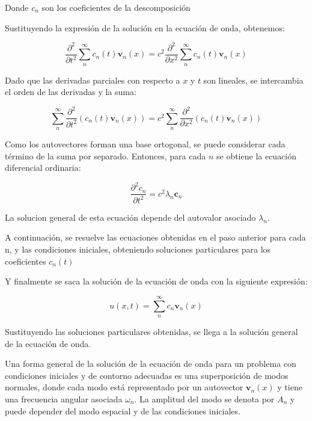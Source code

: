 \documentclass{article}
\begin{document}
    Donde \(c_n\) son los coeficientes de la descomposición
    
    Sustituyendo la expresión de la solución en la ecuación de onda, obtenemos:

    \begin{equation}
        \frac{{\partial^2}}{{\partial t^2}}{\sum_{n}^{\infty} c_n(t) \mathbf{v}_n(x)} = c^2\frac{{\partial^2}}{{\partial x^2}}{\sum_{n}^{\infty} c_n(t) \mathbf{v}_n(x)}
    \end{equation}
    
    Dado que las derivadas parciales con respecto a $x$ y $t$ son lineales, se intercambia el orden de las derivadas y la suma:

    \begin{equation}
        {\sum_{n}^{\infty} \frac{{\partial^2}}{{\partial t^2}}(c_n(t) \mathbf{v}_n(x))} = c^2{\sum_{n}^{\infty}\frac{{\partial^2}}{{\partial x^2}}(c_n(t) \mathbf{v}_n(x))}
    \end{equation}
    
    Como los autovectores forman una base ortogonal, se puede considerar cada término de la suma por separado. Entonces, para cada $n$ se obtiene la ecuación diferencial ordinaria:

    \begin{equation}
        \frac{{\partial^2 c_n}}{{\partial t^2}} = c^2\lambda_n \mathbf c_n
    \end{equation}

    La solucion general de esta ecuación depende del autovalor asociado $\lambda_n$.

    A continuación, se resuelve las ecuaciones obtenidas en el paso anterior para cada n, y las condiciones iniciales, obteniendo soluciones particulares para los coeficientes $c_n(t)$

    Y finalmente se saca la solución de la ecuación de onda con la siguiente expresión:

    \begin{equation}
        u(x, t) = \sum_{n}^{\infty} c_n \mathbf{v}_n(x)
    \end{equation}

    Sustituyendo las soluciones particulares obtenidas, se llega a la solución general de la ecuación de onda.

    Una forma general de la solución de la ecuación de onda para un problema con condiciones iniciales y de contorno adecuadas es una superposición de modos normales, donde cada modo está representado por un autovector $\mathbf{v}_n(x)$ y tiene una frecuencia angular asociada $\omega_n$. La amplitud del modo se denota por $A_n$ y puede depender del modo espacial y de las condiciones iniciales.
\end{document}
